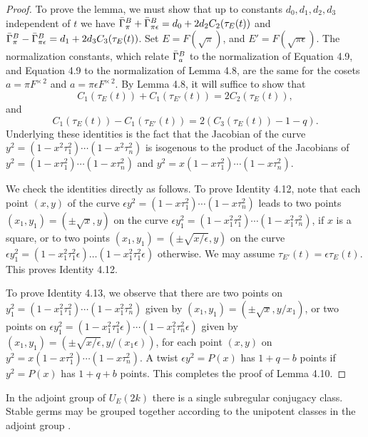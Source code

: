 \documentclass{amsart}
\begin{document}
\begin{proof}
To prove the lemma, we must show that up to constants $d_0,d_1,d_2,d_3$ 
independent of $t$ we have
$\bar\Gamma_\pi^B + \bar\Gamma_{\pi\epsilon}^B = d_0+ 2d_2 C_2(\tau_E(t))$
and 
$\bar\Gamma_\pi^B - \bar\Gamma_{\pi\epsilon}^B = d_1+ 2d_3 C_3(\tau_E(t))$.
Set $E= F(\sqrt{\pi})$, and
$E'=F(\sqrt{\pi\epsilon})$.  
The normalization constants, which relate $\bar\Gamma^B_a$ to the
normalization of Equation 4.9, and Equation 4.9 to the normalization
of Lemma 4.8, are the same for the cosets $a=\pi F^{\times\,2}$
and $a=\pi\epsilon F^{\times\,2}$.
By Lemma 4.8, it will suffice to show
that 
\begin{equation}\tag{4.12}
C_1(\tau_E(t)) + C_1(\tau_{E'}(t)) =2  C_2(\tau_E(t)),
\end{equation}
and
\begin{equation}\tag{4.13}
C_1(\tau_E(t)) - C_1(\tau_{E'}(t)) = 2 (C_3(\tau_E(t))-1-q).
\end{equation}
Underlying these identities is the fact that the Jacobian of the
curve $y^2 = (1-x^2\tau_1^2)\cdots (1-x^2\tau_n^2)$ is isogenous
to the product of the Jacobians of $y^2 = (1-x \tau_1^2)\cdots (1-x\tau_n^2)$ and $y^2 = x(1-x \tau_1^2)\cdots (1-x\tau_n^2)$.  

We check
the identities directly as follows.  To prove Identity 4.12, note that
each point $(x,y)$ of the curve $\epsilon y^2 = (1-x\tau_1^2)\cdots
(1-x\tau_n^2)$ leads to two points $(x_1,y_1) = (\pm\sqrt{x},y)$ on the
curve $\epsilon y_1^2 = (1- x_1^2\tau_1^2)\cdots (1-x_1^2 \tau_n^2)$,
if $x$ is a square,
or to two points $(x_1,y_1) = (\pm \sqrt{x/\epsilon},y)$ on the
curve $\epsilon y_1^2 = 
(1-x_1^2\tau_1^2\epsilon)\ldots(1-x_1^2 \tau_1^2\epsilon)$
otherwise.
We may assume $\tau_{E'}(t) = \epsilon \tau_E(t)$.
This proves Identity 4.12.

To prove Identity 4.13, we observe that there are two points on
$y_1^2 = (1-x_1^2\tau_1^2)\cdots (1-x_1^2\tau_n^2)$ given by
$(x_1,y_1) = (\pm \sqrt{x},y/x_1)$, or two points
on $\epsilon y_1^2 = (1-x_1^2\tau_1^2\epsilon)\cdots
   (1-x^2_1\tau_n^2\epsilon)$ given by $(x_1,y_1) 
= (\pm\sqrt{x/\epsilon},y/(x_1\epsilon))$,
for each point $(x,y)$ on $y^2=x(1-x\tau^2_1)\cdots (1-x\tau^2_n)$.
A twist $\epsilon y^2 = P(x)$
has $1+q-b$ points if $y^2 = P(x)$ has $1+q+b$ points.  This completes
the proof of Lemma 4.10. \end{proof}

\bigskip
In the adjoint group of $U_E(2k)$ there is a single 
subregular conjugacy class.  Stable germs may be grouped together
according to the unipotent classes in the adjoint group
\cite{H3,VII.5.4}.
\end{document}

